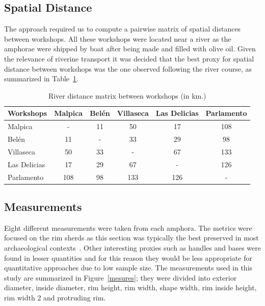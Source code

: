 \documentclass[review]{elsarticle}
\begin{document}
\subsection{Spatial Distance}

The approach required us to compute a pairwise matrix of spatial distances between workshops. All these workshops were located near a river as the amphorae were shipped by boat after being made and filled with olive oil. Given the relevance of riverine transport it was decided that the best proxy for spatial distance between workshops was the one observed following the river course, as summarized in Table~\ref{table:distances}.

\begin{table}[htp]
\centering

\begin{tabular}{lccccc}
\hline

\textbf{Workshops} & Malpica & Belén & Villaseca & Las Delicias & Parlamento \\ \hline
Malpica & - & 11 & 50 & 17 & 108 \\
Belén & 11 & - & 33 & 29 & 98 \\
Villaseca & 50 & 33 & - & 67 & 133 \\
Las Delicias & 17 & 29 & 67 & - & 126 \\
Parlamento & 108 & 98 & 133 & 126 & - \\
\hline
\end{tabular}
\caption{River distance matrix between workshops (in km.)}
\label{table:distances}
\end{table}

\subsection{Measurements}

Eight different measurements were taken from each amphora. The metrics were focused on the rim sherds as this section was typically the best preserved in most archaeological contexts~\citep{berni_millet_epigrafianforica_2008}. Other interesting proxies such as handles and bases were found in lesser quantities and for this reason they would be less appropriate for quantitative approaches due to low sample size. The measurements used in this study are summarized in Figure~\ref{mesures}; they were divided into exterior diameter, inside diameter, rim height, rim width, shape width, rim inside height, rim width 2 and protruding rim.
\end{document}
